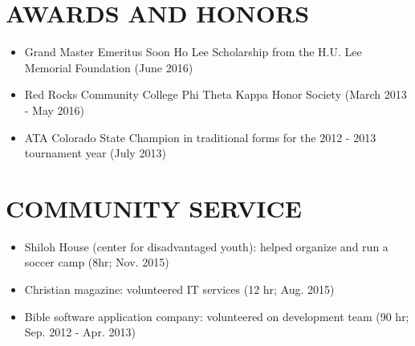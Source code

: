 \documentclass[10.5pt,letterpaper]{article}
\begin{document}
\section*{AWARDS AND HONORS}
\begin{itemize}
    \item Grand Master Emeritus Soon Ho Lee Scholarship from the H.U. Lee
        Memorial Foundation (June 2016)
    \item Red Rocks Community College Phi Theta Kappa Honor Society (March 2013
        - May 2016)
    \item ATA Colorado State Champion in traditional forms for the 2012 - 2013
        tournament year (July 2013)
\end{itemize}

\section*{COMMUNITY SERVICE}
\begin{itemize}
    \item Shiloh House (center for disadvantaged youth): helped organize and run
        a soccer camp (8hr; Nov. 2015)
    \item Christian magazine: volunteered IT services (12 hr; Aug. 2015)
    \item Bible software application company: volunteered on development team
        (90 hr; Sep.  2012 - Apr. 2013)
\end{itemize}
\end{document}
